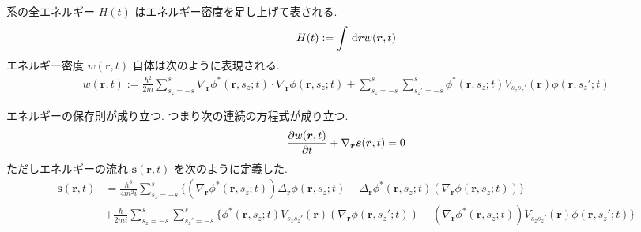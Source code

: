 \documentclass[uplatex,dvipdfmx,a4paper,11pt]{jlreq}
\newcommand{\rr}{\bm{r}}
\renewcommand{\ss}{\bm{s}}
\numberwithin{equation}{section}
\theoremstyle{definition}
\begin{document}
\begin{definition}[エネルギー]
  系の全エネルギー $H(t)$ はエネルギー密度を足し上げて表される.
  \begin{align}
    H(t) := \int\dl{\rr}w(\rr, t)
  \end{align}
  エネルギー密度 $w(\rr, t)$ 自体は次のように表現される.
  \begin{align}
    w(\rr, t) := \frac{\hbar^2}{2m}\sum_{s_z = -s}^{s}\nabla_{\rr}\phi^*(\rr, s_z; t)\cdot\nabla_{\rr}\phi(\rr, s_z; t) + \sum_{s_z = -s}^{s}\sum_{s_z' = -s}^{s}\phi^*(\rr, s_z; t)V_{s_zs_z'}(\rr)\phi(\rr, s_z'; t)
  \end{align}
\end{definition}
\begin{theorem}[Q21-98(ii)(iii)(iv)]
  エネルギーの保存則が成り立つ. つまり次の連続の方程式が成り立つ.
  \begin{align}
    \diffp{w(\rr, t)}{t} + \nabla_{\rr}\ss(\rr, t) = 0
  \end{align}
  ただしエネルギーの流れ $\ss(\rr, t)$ を次のように定義した.
  \begin{align}
    \ss(\rr, t) & = \frac{\hbar^3}{4m^2i}\sum_{s_z = -s}^{s}\{(\nabla_{\rr}\phi^*(\rr, s_z; t))\Delta_{\rr}\phi(\rr, s_z; t) - \Delta_{\rr}\phi^*(\rr, s_z; t)(\nabla_{\rr}\phi(\rr, s_z; t))\}                           \\
                & + \frac{\hbar}{2mi}\sum_{s_z = -s}^{s}\sum_{s_z' = -s}^{s}\{\phi^*(\rr, s_z; t)V_{s_zs_z'}(\rr)(\nabla_{\rr}\phi(\rr, s_z'; t)) - (\nabla_{\rr}\phi^*(\rr, s_z; t))V_{s_zs_z'}(\rr)\phi(\rr, s_z'; t)\}
  \end{align}
\end{theorem}
\end{document}
